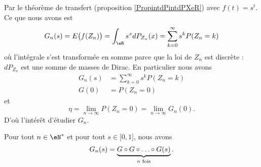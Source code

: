     Par le théorème de transfert (proposition \ref{PropintdPintdPXeR}) avec \( f(t)=s^t\). Ce que nous avons est
    \begin{equation}        \label{EqNRtXdC}
        G_n(s)=E\big( f(Z_n) \big)=\int_{\eR}s^xdP_{Z_n}(x)=\sum_{k=0}^{\infty}s^kP(Z_n=k)
    \end{equation}
    où l'intégrale s'est transformée en somme parce que la loi de \( Z_n\) est discrète : \( dP_{Z_n}\) est une somme de masses de Dirac. En particulier nous avons
    \begin{subequations}
        \begin{align}
            G_n(s)&=\sum_{k=0}^{\infty}s^kP(Z_n=k)\\
            G(0)&=P(Z_n=0)
        \end{align}
    \end{subequations}
    et
    \begin{equation}
        \eta=\lim_{n\to \infty} P(Z_n=0)=\lim_{n\to \infty} G_n(0).
    \end{equation}
    D'où l'intérêt d'étudier \( G_n\).

\begin{lemma}       \label{LemezrOiI}
    Pour tout \( n\in \eN^*\) et pour tout \( s\in\mathopen[ 0 , 1 \mathclose]\), nous avons
    \begin{equation}
        G_n(s)=\underbrace{G\circ G\circ\ldots\circ G(s)}_{\text{\( n\) fois}}.
    \end{equation}
\end{lemma}

